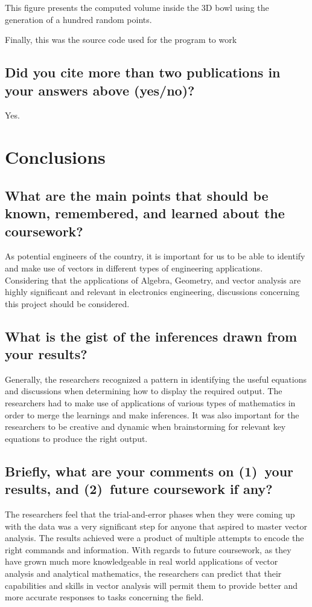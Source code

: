 This figure presents the computed volume inside the 3D bowl using the generation of a hundred random points.

Finally, this was the source code used for the program to work


\subsection{Did you cite more than two publications in your answers above (yes/no)?}
Yes.	


\section{Conclusions}
\label{sec:conc}

\subsection{What are the main points that should be known, remembered, and learned about the coursework?}
As potential engineers of the country, it is important for us to be able to identify and make use of vectors in different types of engineering applications. Considering that the applications of Algebra, Geometry, and vector analysis are highly significant and relevant in electronics engineering, discussions concerning this project should be considered.


\subsection{What is the gist of the inferences drawn from your results?}
Generally, the researchers recognized a pattern in identifying the useful equations and discussions when determining how to display the required output. The researchers had to make use of applications of various types of mathematics in order to merge the learnings and make inferences. It was also important for the researchers to be creative and dynamic when brainstorming for relevant key equations to produce the right output.


\subsection{Briefly, what are your comments on (1)~your results, and  (2)~future coursework if any?}
The researchers feel that the trial-and-error phases when they were coming up with the data was a very significant step for anyone that aspired to master vector analysis. The results achieved were a product of multiple attempts to encode the right commands and information. With regards to future coursework, as they have grown much more knowledgeable in real world applications of vector analysis and analytical mathematics, the researchers can predict that their capabilities and skills in vector analysis will permit them to provide better and more accurate responses to tasks concerning the field.


